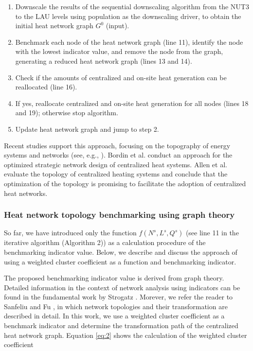 \begin{enumerate}[nolistsep]
	\item Downscale the results of the sequential downscaling algorithm from the NUT3 to the LAU levels using population as the downscaling driver, to obtain the initial heat network graph $G^{0}$ (input).
	\item Benchmark each node of the heat network graph (line 11), identify the node with the lowest indicator value, and remove the node from the graph, generating a reduced heat network graph (lines 13 and 14).
	\item Check if the amounts of centralized and on-site heat generation can be reallocated (line 16).
	\item If yes, reallocate centralized and on-site heat generation for all nodes (lines 18 and 19); otherwise stop algorithm.
	\item Update heat network graph and jump to step 2.
\end{enumerate}
\vspace{0.5cm}

Recent studies support this approach, focusing on the topography of energy systems and networks (see, e.g., \cite{abuelnasr2018examining}). Bordin et al. \cite{bordin2016optimization} conduct an approach for the optimized strategic network design of centralized heat systems. Allen et al. \cite{allen2020evaluation} evaluate the topology of centralized heating systems and conclude that the optimization of the topology is promising to facilitate the adoption of centralized heat networks. 

\subsubsection{Heat network topology benchmarking using graph theory}\label{bench}
So far, we have introduced only the function $f(N^{s}, L^{s}, Q^{s})$ (see line 11 in the iterative algorithm (Algorithm 2)) as a calculation procedure of the benchmarking indicator value. Below, we describe and discuss the approach of using a weighted cluster coefficient as a function and benchmarking indicator.\vspace{0.3cm}

The proposed benchmarking indicator value is derived from graph theory. Detailed information in the context of network analysis using indicators can be found in the fundamental work by Strogatz \cite{strogatz2001exploring}. Morever, we refer the reader to Sanfeliu and Fu \cite{sanfeliu1983distance}, in which network topologies and their transformation are described in detail. In this work, we use a weighted cluster coefficient as a benchmark indicator and determine the transformation path of the centralized heat network graph. Equation \ref{eq:2} shows the calculation of the weighted cluster coefficient

